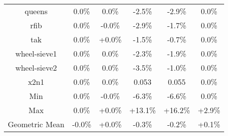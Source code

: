 \begin{tabular}{ c c c c c c }
queens &  0.0\% &  0.0\% & -2.5\% & -2.9\% &  0.0\%\\
rfib &  0.0\% & -0.0\% & -2.9\% & -1.7\% &  0.0\%\\
tak &  0.0\% & +0.0\% & -1.5\% & -0.7\% &  0.0\%\\
wheel-sieve1 &  0.0\% &  0.0\% & -2.3\% & -1.9\% &  0.0\%\\
wheel-sieve2 &  0.0\% &  0.0\% & -3.5\% & -1.0\% &  0.0\%\\
x2n1 &  0.0\% &  0.0\% & 0.053 & 0.055 &  0.0\%\\
\hline
Min &  0.0\% & -0.0\% & -6.3\% & -6.6\% &  0.0\%\\
Max &  0.0\% & +0.0\% & +13.1\% & +16.2\% & +2.9\%\\
Geometric Mean & -0.0\% & +0.0\% & -0.3\% & -0.2\% & +0.1\%\\


\end{tabular}
